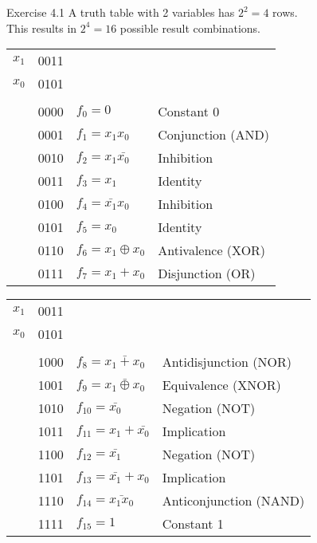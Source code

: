 \documentclass[11pt]{tudbeamer}
\begin{document}
\begin{frame}[allowframebreaks]{Exercise 4.1}
	A truth table with 2 variables has $2^2 = 4$ rows. \\
	This results in $2^4 = 16$ possible result combinations.
	
\framebreak

	\begin{tabular}{lcll}
	$x_1$ 	& 0011 &&\\
	$x_0$ 	& 0101 &&\\
	\hline \\
			& 0000 & $f_0 = 0$ 				& Constant 0 \\
			& 0001 & $f_1 = x_1 x_0$ 		& Conjunction (AND) \\
			& 0010 & $f_2 = x_1 \bar{x_0}$ 	& Inhibition \\
			& 0011 & $f_3 = x_1$ 			& Identity \\
			& 0100 & $f_4 = \bar{x_1} x_0$ 	& Inhibition \\
			& 0101 & $f_5 = x_0$ 			& Identity \\
			& 0110 & $f_6 = x_1 \oplus x_0$ 	& Antivalence (XOR) \\
			& 0111 & $f_7 = x_1 + x_0$ 		& Disjunction (OR) \\
	\end{tabular}	
	
\framebreak

	\begin{tabular}{lcll}
	$x_1$ 	& 0011 &&\\
	$x_0$ 	& 0101 &&\\
	\hline \\
			& 1000 & $f_8 = \bar{x_1 + x_0}$		& Antidisjunction (NOR) \\
			& 1001 & $f_9 = \bar{x_1 \oplus x_0}$& Equivalence (XNOR) \\
			& 1010 & $f_10 = \bar{x_0}$ 			& Negation (NOT) \\
			& 1011 & $f_11 = x_1 + \bar{x_0}$ 	& Implication \\
			& 1100 & $f_12 = \bar{x_1}$ 			& Negation (NOT) \\
			& 1101 & $f_13 = \bar{x_1} + x_0$ 	& Implication \\
			& 1110 & $f_14 = \bar{x_1 x_0}$ 		& Anticonjunction (NAND)\\
			& 1111 & $f_15 = 1$ 					& Constant 1 \\
	\end{tabular}	

\end{frame}
\end{document}
